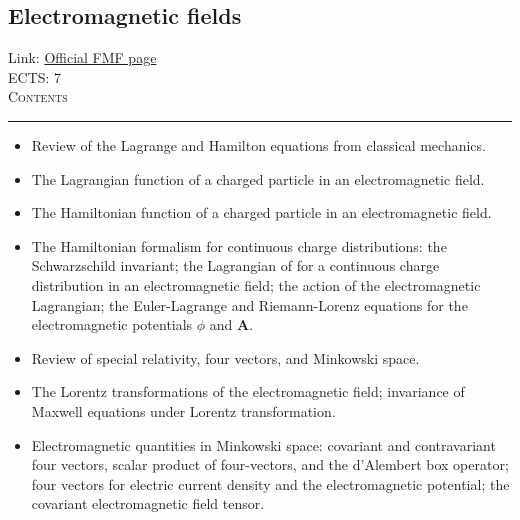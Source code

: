 \documentclass[11pt, a4paper]{article}
\newenvironment{course}[3]{
\subsection{#1}%
Link: \href{#2}{Official FMF page}\\%
ECTS: #3%
\vspace{1ex}
\\
{\large \textsc{Contents}}\\[-0.9ex]%
\rule{\textwidth}{0.5pt}
\vspace{-3ex}
}
{}
\newenvironment{chapter}[1]{
\begin{tcolorbox}[title=#1, breakable]
}
{\end{tcolorbox}}
\begin{document}
\begin{course}{Electromagnetic fields}{https://www.fmf.uni-lj.si/en/study-physics/programmes/1fiz/2020/7000777/courses/1133/}{7}
\begin{chapter}{Frequency dependence of the dielectric function}
\begin{itemize}
        \end{itemize}
    \end{chapter}

    \begin{chapter}{Introduction to the Hamiltonian formalism for electromagnetism}

        \begin{itemize}
        
            \item Review of the Lagrange and Hamilton equations from classical mechanics.

            \item The Lagrangian function of a charged particle in an electromagnetic field.

            \item The Hamiltonian function of a charged particle in an electromagnetic field.

            \item The Hamiltonian formalism for continuous charge distributions: the Schwarzschild invariant; the Lagrangian of for a continuous charge distribution in an electromagnetic field; the action of the electromagnetic Lagrangian; the Euler-Lagrange and Riemann-Lorenz equations for the electromagnetic potentials $ \phi $ and $ \bm{A} $.
        
        \end{itemize}
        
    \end{chapter}

    \begin{chapter}{Introduction to relativistic electromagnetism}
        \begin{itemize}
        
            \item Review of special relativity, four vectors, and Minkowski space.

            \item The Lorentz transformations of the electromagnetic field; invariance of Maxwell equations under Lorentz transformation.

            \item Electromagnetic quantities in Minkowski space: covariant and contravariant four vectors, scalar product of four-vectors, and the d'Alembert box operator; four vectors for electric current density and the electromagnetic potential; the covariant electromagnetic field tensor.
        
        \end{itemize}
    \end{chapter}

\end{course}
\end{document}
